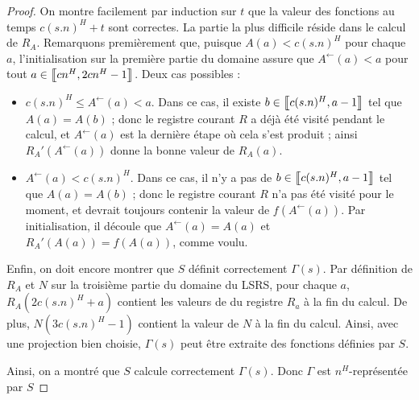 \documentclass{article}
\begin{document}
\begin{proof}
			On montre facilement par induction sur $t$ que la valeur des fonctions au temps $c(s.n)^H+t$ sont correctes. La partie la plus difficile réside dans le calcul de $R_A$. Remarquons premièrement que, puisque $A(a) < c(s.n)^H$ pour chaque $a$, l'initialisation sur la première partie du domaine assure que $A^{\leftarrow}(a) < a$ pour tout $a \in \left[\!\!\>\!\left[ cn^H , 2cn^H-1 \right]\!\!\>\!\right]$. Deux cas possibles :
			
			\begin{itemize}[itemsep=-1mm]
				\item 	
					$c(s.n)^H \leqslant A^{\leftarrow}(a) < a$. Dans ce cas, il existe $b \in \left[\!\!\>\!\left[ c(s.n)^H , a-1 \right]\!\!\>\!\right]$ tel que $A(a) = A(b)$ ; donc le registre courant $R$ a déjà été visité pendant le calcul, et $A^{\leftarrow}(a)$ est la dernière étape où cela s'est produit ; ainsi $R_A'\left(A^{\leftarrow}(a)\right)$ donne la bonne valeur de $R_A(a)$.
					
				\item 
					$A^{\leftarrow}(a) < c(s.n)^H$. Dans ce cas, il n'y a pas de $b \in \left[\!\!\>\!\left[ c(s.n)^H , a-1 \right]\!\!\>\!\right]$ tel que $A(a) = A(b)$ ; donc le registre courant $R$ n'a pas été visité pour le moment, et devrait toujours contenir la valeur de $f(A^{\leftarrow}(a))$\footnotemark. Par initialisation, il découle que $A^{\leftarrow}(a) = A(a)$ et $R_A'(A(a)) = f(A(a))$, comme voulu.
					
			\end{itemize}
			
			Enfin, on doit encore montrer que $S$ définit correctement $\Gamma(s)$. Par définition de $R_A$ et $N$ sur la troisième partie du domaine du LSRS, pour chaque $a$, $R_A\left( 2 c(s.n)^H + a \right)$ contient les valeurs de du registre $R_a$ à la fin du calcul. De plus, $N(3c(s.n)^H-1)$ contient la valeur de $N$ à la fin du calcul. Ainsi, avec une projection bien choisie, $\Gamma(s)$ peut être extraite des fonctions définies par $S$. 
			
			Ainsi, on a montré que $S$ calcule correctement $\Gamma(s)$. Donc $\Gamma$ est $n^H$-représentée par $S$
			
		\end{proof}

	
\end{document}
